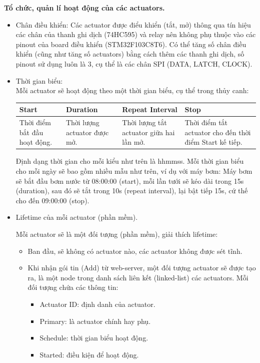 \documentclass[a4paper,12pt,oneside]{article}
\begin{document}
\noindent \textbf{Tổ chức, quản lí hoạt động của các actuators.}

\begin{itemize}
\item Chân điều khiển: Các actuator được điểu khiển (tắt, mở) thông qua tín hiệu các chân của thanh ghi dịch (74HC595) và relay nên không phụ thuộc vào các pinout của board điều khiển (STM32F103C8T6). Có thể tăng số chân điều khiển (cũng như tăng số actuators) bằng cách thêm các thanh ghi dịch, số pinout sử dụng luôn là 3, cụ thể là các chân SPI (DATA, LATCH, CLOCK).

\item Thời gian biểu:\\
Mỗi actuator sẽ hoạt động theo một thời gian biểu, cụ thể trong thủy canh:

\begin{center}
\begin{tabularx}{\linewidth}{ |X|X|X|X| }
\hline
Start & Duration & Repeat Interval & Stop\\
\hline
Thời điểm bắt đầu hoạt động. & Thời lượng actuator được mở. & Thời lượng tắt actuator giữa hai lần mở. & Thời điểm tắt actuator cho đến thời điểm Start kế tiếp.\\
\hline
\end{tabularx}
\end{center}

\noindent Định dạng thời gian cho mỗi kiểu như trên là hhmmss. Mỗi thời gian biểu cho mỗi ngày sẽ bao gồm nhiều mẫu như trên, ví dụ với máy bơm: Máy bơm sẽ bắt đầu bơm nước từ 08:00:00 (start), mỗi lần tưới sẽ kéo dài trong 15s (duration), sau đó sẽ tắt trong 10s (repeat interval), lại bật tiếp 15s, cứ thế cho đến 09:00:00 (stop).


\item Lifetime của mỗi actuator (phần mềm).

\noindent Mỗi actuator sẽ là một đối tượng (phần mềm), giải thích lifetime:
	\begin{itemize}
	\item Ban đầu, sẽ không có actuator nào, các actuator không được sét tĩnh.
	\item  Khi nhận gói tin (Add) từ web-server, một đối tượng actuator sẽ được tạo ra, là một node trong danh sách liên kết (linked-list) các actuators. Mỗi đối tượng chứa các thông tin:
\begin{itemize}
\item Actuator ID: định danh của actuator.
\item Primary: là actuator chính hay phụ.
\item Schedule: thời gian biểu hoạt động.
\item Started: điều kiện để hoạt động.
\end{itemize}


\end{itemize}
\end{itemize}
\end{document}

